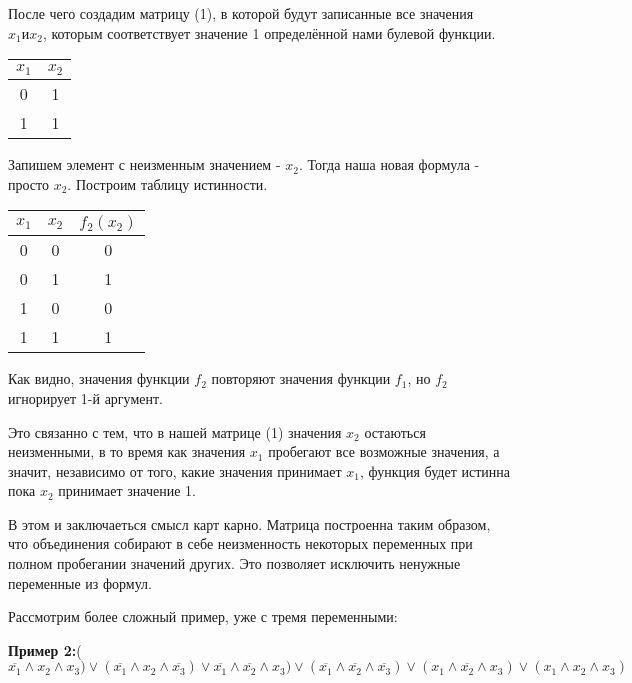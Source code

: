 \documentclass{article}
\begin{document}
\vspace{1em}

После чего создадим матрицу (1), в которой будут записанные все значения $x_{1} и x_{2}$, которым соответствует значение 1 определённой нами булевой функции.

\begin{tabular}{c|c}
$x_{1}$ &  $x_{2}$ \\
\hline
0 & 1 \\
1 & 1 \\
\end{tabular}
\newpage
Запишем элемент с неизменным значением - $x_{2}$. Тогда наша новая формула - просто $x_{2}$. Построим таблицу истинности.

\begin{tabular}{c|c|c}
$x_{1}$ & $x_{2}$ & $f_{2}(x_{2})$ \\
\hline
0 & 0 & 0 \\
0 & 1 & 1 \\
1 & 0 & 0 \\
1 & 1 & 1 \\
\end{tabular}

Как видно, значения функции $f_{2}$ повторяют значения функции $f_{1}$, но $f_{2}$ игнорирует 1-й аргумент.

\vspace{1em}

Это связанно с тем, что в нашей матрице (1) значения $x_{2}$ остаються неизменными, в то время как значения $x_{1}$ пробегают все возможные значения, а значит, независимо от того, какие значения принимает $x_{1}$, функция будет истинна пока $x_{2}$ принимает значение 1.

\vspace{1em}

В этом и заключаеться смысл карт карно. Матрица построенна таким образом, что объединения собирают в себе неизменность некоторых переменных при полном пробегании значений других. Это позволяет исключить ненужные переменные из формул.

\vspace{1em}

Рассмотрим более сложный пример, уже с тремя переменными:

\textbf{Пример 2:}($\overline{x_{1}} \land x_{2} \land x_{3}) \lor (\overline{x_{1}} \land x_{2} \land \overline{x_{3}}) \lor \overline{x_{1}} \land \overline{x_{2}} \land x_{3}) \lor (\overline{x_{1}} \land \overline{x_{2}} \land \overline{x_{3}}) \lor (x_{1} \land  \overline{x_{2}} \land x_{3}) \lor(x_{1} \land x_{2} \land x_{3})$
\end{document}
